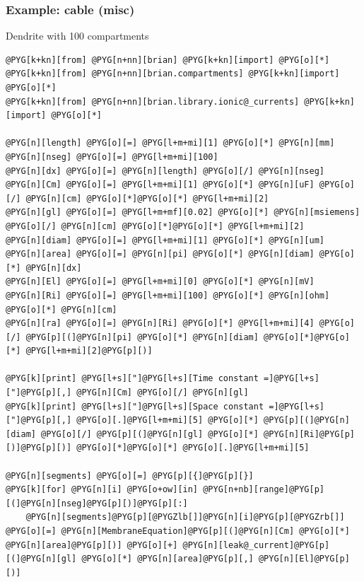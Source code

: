 \documentclass[letterpaper,10pt,english]{manual}
\begin{document}
\resetcurrentobjects
\hypertarget{--doc-examples-misc_cable}{}

\hypertarget{index-43}{}\subsubsection{Example: cable (misc)}

Dendrite with 100 compartments

\begin{Verbatim}[commandchars=@\[\]]
@PYG[k+kn][from] @PYG[n+nn][brian] @PYG[k+kn][import] @PYG[o][*]
@PYG[k+kn][from] @PYG[n+nn][brian.compartments] @PYG[k+kn][import] @PYG[o][*]
@PYG[k+kn][from] @PYG[n+nn][brian.library.ionic@_currents] @PYG[k+kn][import] @PYG[o][*]

@PYG[n][length] @PYG[o][=] @PYG[l+m+mi][1] @PYG[o][*] @PYG[n][mm]
@PYG[n][nseg] @PYG[o][=] @PYG[l+m+mi][100]
@PYG[n][dx] @PYG[o][=] @PYG[n][length] @PYG[o][/] @PYG[n][nseg]
@PYG[n][Cm] @PYG[o][=] @PYG[l+m+mi][1] @PYG[o][*] @PYG[n][uF] @PYG[o][/] @PYG[n][cm] @PYG[o][*]@PYG[o][*] @PYG[l+m+mi][2]
@PYG[n][gl] @PYG[o][=] @PYG[l+m+mf][0.02] @PYG[o][*] @PYG[n][msiemens] @PYG[o][/] @PYG[n][cm] @PYG[o][*]@PYG[o][*] @PYG[l+m+mi][2]
@PYG[n][diam] @PYG[o][=] @PYG[l+m+mi][1] @PYG[o][*] @PYG[n][um]
@PYG[n][area] @PYG[o][=] @PYG[n][pi] @PYG[o][*] @PYG[n][diam] @PYG[o][*] @PYG[n][dx]
@PYG[n][El] @PYG[o][=] @PYG[l+m+mi][0] @PYG[o][*] @PYG[n][mV]
@PYG[n][Ri] @PYG[o][=] @PYG[l+m+mi][100] @PYG[o][*] @PYG[n][ohm] @PYG[o][*] @PYG[n][cm]
@PYG[n][ra] @PYG[o][=] @PYG[n][Ri] @PYG[o][*] @PYG[l+m+mi][4] @PYG[o][/] @PYG[p][(]@PYG[n][pi] @PYG[o][*] @PYG[n][diam] @PYG[o][*]@PYG[o][*] @PYG[l+m+mi][2]@PYG[p][)]

@PYG[k][print] @PYG[l+s]["]@PYG[l+s][Time constant =]@PYG[l+s]["]@PYG[p][,] @PYG[n][Cm] @PYG[o][/] @PYG[n][gl]
@PYG[k][print] @PYG[l+s]["]@PYG[l+s][Space constant =]@PYG[l+s]["]@PYG[p][,] @PYG[o][.]@PYG[l+m+mi][5] @PYG[o][*] @PYG[p][(]@PYG[n][diam] @PYG[o][/] @PYG[p][(]@PYG[n][gl] @PYG[o][*] @PYG[n][Ri]@PYG[p][)]@PYG[p][)] @PYG[o][*]@PYG[o][*] @PYG[o][.]@PYG[l+m+mi][5]

@PYG[n][segments] @PYG[o][=] @PYG[p][{]@PYG[p][}]
@PYG[k][for] @PYG[n][i] @PYG[o+ow][in] @PYG[n+nb][range]@PYG[p][(]@PYG[n][nseg]@PYG[p][)]@PYG[p][:]
    @PYG[n][segments]@PYG[p][@PYGZlb[]]@PYG[n][i]@PYG[p][@PYGZrb[]] @PYG[o][=] @PYG[n][MembraneEquation]@PYG[p][(]@PYG[n][Cm] @PYG[o][*] @PYG[n][area]@PYG[p][)] @PYG[o][+] @PYG[n][leak@_current]@PYG[p][(]@PYG[n][gl] @PYG[o][*] @PYG[n][area]@PYG[p][,] @PYG[n][El]@PYG[p][)]


\end{Verbatim}
\end{document}
